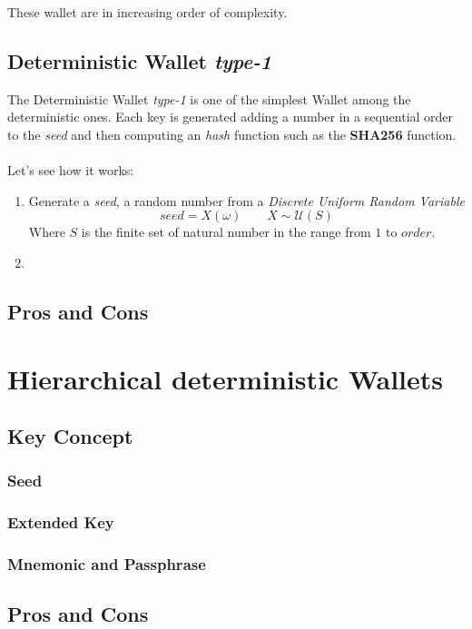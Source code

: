 These wallet are in increasing order of complexity.

\subsection{Deterministic Wallet \textit{type-1}}
The Deterministic Wallet \textit{type-1} is one of the simplest Wallet among the deterministic ones. Each key is generated adding a number in a sequential order to the \textit{seed} and then computing an \textit{hash} function such as the \textbf{SHA256} function.
\\ \\
Let's see how it works:

\begin{enumerate}[label=(\roman*)]
	\item Generate a \textit{seed}, a random number from a \textit{Discrete Uniform Random Variable}
	\begin{equation*}
	seed=X(\omega) \qquad X\sim \mathcal{U}(S)
	\end{equation*}
	Where $S$ is the finite set of natural number in the range from $1$ to $order$.
	\item
\end{enumerate}


\subsection{Pros and Cons}

\section{Hierarchical deterministic Wallets}

\subsection{Key Concept}

\subsubsection{Seed}

\subsubsection{Extended Key}

\subsubsection{Mnemonic and Passphrase}

\subsection{Pros and Cons}

